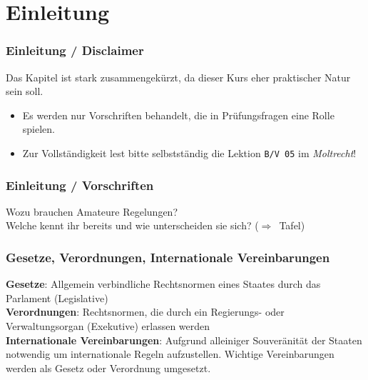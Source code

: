 

\subtitle{Betriebstechnik/Vorschriften 05:  \\
  Gesetze, Vorschriften, Regelungen \\[2em]}
\date{Stand 24.10.2016}


\section{Einleitung}

\begin{frame}
  \frametitle{Einleitung / Disclaimer}

  \begin{center}
    \Large{Das Kapitel ist stark zusammengekürzt, da dieser Kurs eher
    praktischer Natur sein soll.}
  \end{center}

  \normalsize

  \begin{itemize}
    \item Es werden nur Vorschriften behandelt, die in Prüfungsfragen eine Rolle spielen.
    \item Zur Vollständigkeit lest bitte selbstständig die Lektion \texttt{B/V 05} im
      \emph{Moltrecht}!
  \end{itemize}

\end{frame}


\begin{frame}
  \frametitle{Einleitung / Vorschriften}

  \begin{center}
    \Large{Wozu brauchen Amateure Regelungen?} \\
    \Large{Welche kennt ihr bereits und wie unterscheiden sie sich? ($\Rightarrow$~Tafel)}
  \end{center}

\end{frame}

\begin{frame}
  \frametitle{Gesetze, Verordnungen, Internationale Vereinbarungen}

  \textbf{Gesetze}: Allgemein verbindliche Rechtsnormen eines Staates durch
  das Parlament (Legislative) \\[1em]

  \textbf{Verordnungen}: Rechtsnormen, die durch ein Regierungs- oder
  Verwaltungsorgan (Exekutive) erlassen werden \\[1em]

  \textbf{Internationale Vereinbarungen}: Aufgrund alleiniger Souveränität der
  Staaten notwendig um internationale Regeln aufzustellen. Wichtige Vereinbarungen
  werden als Gesetz oder Verordnung umgesetzt.

\end{frame}


